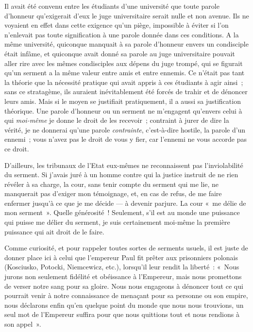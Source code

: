 \documentclass[french,twoside]{book} %
\begin{document}
Il avait été convenu entre les étudiants d’une université que toute parole d’honneur qu’exigerait d’eux le juge universitaire serait nulle et non avenue. Ils ne voyaient en effet dans cette exigence qu’un piège, impossible à éviter si l’on n’enlevait pas toute signification à une parole donnée dans ces conditions. A la même université, quiconque manquait à sa parole d’honneur envers un condisciple était infâme, et quiconque avait donné sa parole au juge universitaire pouvait aller rire avec les mêmes condisciples aux dépens du juge trompé, qui se figurait qu’un serment a la même valeur entre amis et entre ennemis. Ce n’était pas tant la théorie que la nécessité pratique qui avait appris à ces étudiants à agir ainsi ; sans ce  stratagème, ils auraient inévitablement été forcés de trahir et de dénoncer leurs amis. Mais si le moyen se justifiait pratiquement, il a aussi sa justification théorique. Une parole d’honneur ou un serment ne m’engagent qu’envers celui à qui \emph{moi-même} je donne le droit de les recevoir ; contraint à jurer de dire la vérité, je ne donnerai qu’une parole \emph{contrainte}, c’est-à-dire hostile, la parole d’un ennemi ; vous n’avez pas le droit de vous y fier, car l’ennemi ne vous accorde pas ce droit.\par
D’ailleurs, les tribunaux de l’Etat eux-mêmes ne reconnaissent pas l’inviolabilité du serment. Si j’avais juré à un homme contre qui la justice instruit de ne rien révéler à sa charge, la cour, sans tenir compte du serment qui me lie, ne manquerait pas d’exiger mon témoignage, et, en cas de refus, de me faire enfermer jusqu’à ce que je me décide — à devenir parjure. La cour « me délie de mon serment ». Quelle générosité ! Seulement, s’il est au monde une puissance qui puisse me délier du serment, je suis certainement moi-même la première puissance qui ait droit de le faire.\par
Comme curiosité, et pour rappeler toutes sortes de serments usuels, il est juste de donner place ici à celui que l’empereur Paul fit prêter aux prisonniers polonais (Kosciusko, Potocki, Niemcewicz, etc.), lorsqu’il leur rendit la liberté : « Nous jurons non seulement fidélité et obéissance à l’Empereur, mais nous promettons de verser notre sang pour sa gloire. Nous nous engageons à dénoncer tout ce qui pourrait venir à notre connaissance de menaçant pour sa personne ou son empire, nous déclarons enfin qu’en quelque point du monde que nous nous trouvions, un seul mot de l’Empereur suffira pour que nous quittions tout et nous rendions à son appel ».\par
 
\end{document}
